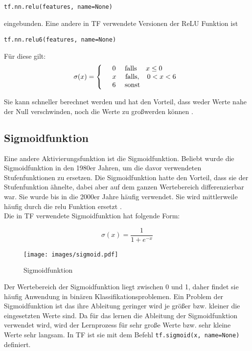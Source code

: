 \vspace{0.3cm}
\begin{lstlisting}
tf.nn.relu(features, name=None)
\end{lstlisting} 

eingebunden. Eine andere in \gls{TF} verwendete Versionen der \gls{ReLU} Funktion ist \cite{cookbook}

\vspace{0.3cm}
\begin{lstlisting}
tf.nn.relu6(features, name=None)
\end{lstlisting}
F\"ur diese gilt:
\begin{align*}
	\sigma(x)=
	\left\{
	\begin{array}{l l}
		& 0 \quad \text{   falls  } \quad x \leq 0  \\ 
		& x \quad \text{   falls},\quad 0 < x < 6 \\
		& 6 \quad \text{   sonst}
	\end{array}
	\right.
\end{align*}

Sie kann schneller berechnet werden und hat den Vorteil, dass weder Werte nahe der Null verschwinden, noch die Werte zu gro\ss werden k\"onnen \cite{cookbook}.


\subsection{Sigmoidfunktion}
Eine andere Aktivierungsfunktion ist die Sigmoidfunktion. Beliebt wurde die Sigmoidfunktion in den 1980er Jahren, um die davor verwendeten Stufenfunktionen zu ersetzen. Die Sigmoidfunktion hatte den Vorteil, dass sie der Stufenfunktion ähnelte, dabei aber auf dem ganzen Wertebereich differenzierbar war. Sie wurde bis in die 2000er Jahre häufig verwendet. Sie wird mittlerweile häufig durch die relu Funktion ersetzt \cite{Goodfellow}. \\
Die in \gls{TF} verwendete Sigmoidfunktion hat folgende Form: \cite{cookbook}

\begin{equation}
\sigma(x)=\frac{1}{1+e^{-x}}
\end{equation}

\begin{figure}[!htp]
	\centering
	\texttt{[image: images/sigmoid.pdf]}
	\caption{Sigmoidfunktion \cite{building}}
\end{figure}


Der Wertebereich der Sigmoidfunktion liegt zwischen 0 und 1, daher findet sie häufig Anwendung in binären Klassifikationsproblemen.\cite{Goodfellow} Ein Problem der Sigmoidfunktion ist das ihre Ableitung geringer wird je größer bzw. kleiner die eingesetzten Werte sind. Da für das lernen die Ableitung der Sigmoidfunktion verwendet wird, wird der Lernprozess für sehr große Werte bzw. sehr kleine Werte sehr langsam.\cite{Goodfellow} In \gls{TF} ist sie mit dem Befehl \lstinline$tf.sigmoid(x, name=None)$ \cite{building}
definiert.


